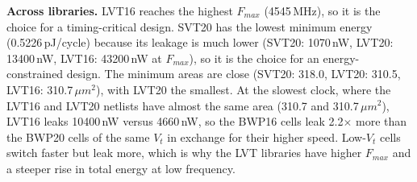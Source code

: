 \documentclass[11pt]{article}
\begin{document}
\textbf{Across libraries.} LVT16 reaches the highest $F_{max}$ (4545\,MHz), so it is the choice for a timing-critical design. SVT20 has the lowest minimum energy (0.5226\,pJ/cycle) because its leakage is much lower (SVT20: 1070\,nW, LVT20: 13400\,nW, LVT16: 43200\,nW at $F_{max}$), so it is the choice for an energy-constrained design. The minimum areas are close (SVT20: 318.0, LVT20: 310.5, LVT16: 310.7\,$\mu m^2$), with LVT20 the smallest. At the slowest clock, where the LVT16 and LVT20 netlists have almost the same area (310.7 and 310.7\,$\mu m^2$), LVT16 leaks 10400\,nW versus 4660\,nW, so the BWP16 cells leak 2.2$\times$ more than the BWP20 cells of the same $V_t$ in exchange for their higher speed. Low-$V_t$ cells switch faster but leak more, which is why the LVT libraries have higher $F_{max}$ and a steeper rise in total energy at low frequency.
\end{document}
